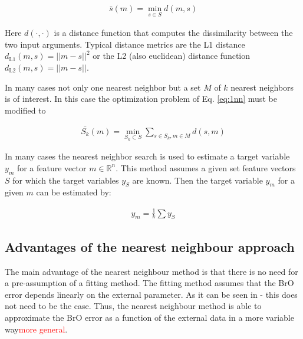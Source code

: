 \documentclass  [
  paper    = a4,
  BCOR     = 10mm,
  twoside,
  fontsize = 12pt,
  fleqn,
  toc      = bibnumbered,
  toc      = listofnumbered,
  numbers  = noendperiod,
  headings = normal,
  listof   = leveldown,
  version  = 3.03
]                                       {scrreprt}
\begin{document}
%

\begin{align}
\bar{s}(m) = \min_{s \in S} d(m, s) \label{eq:1nn}
\end{align}

%
Here $d(\cdot, \cdot)$ is a distance function that computes the dissimilarity between the two input arguments. Typical distance metrics are the L1 distance $d_{\text{L1} 	
}(m, s) = ||m - s||^2$ or the L2 (also euclidean) distance function $d_{\text{L2} 
}(m, s) = ||m - s||$. 


In many cases not only one nearest neighbor but a set $M$ of $k$ nearest neighbors is of interest. In this case the optimization problem of Eq. \ref{eq:1nn} must be modified to

%

\begin{align}
\bar{S_k}(m) = \min_{S_k \subset S} \sum_{s \in S_k, m \in M} d(s, m) \label{eq:knn}
\end{align}

%

In many cases the nearest neighbor search is used to estimate a target variable $y_m$ for a feature vector $m \in \mathbb{R}^n$. This method assumes a given set feature vectors $S$ for which the target variables $y_S$ are known. Then the target variable $y_m$ for a given $m$ can be estimated by:

%

\begin{align}
y_m = \frac{1}{k} \sum y_S \label{eq:knn_regression}
\end{align}

%

\subsection*{Advantages of the nearest neighbour approach}
	The main advantage of the nearest neighbour method is that there is no need for a pre-assumption of a fitting method. The fitting method assumes that the BrO error depends linearly  on the external parameter. As it can be seen in - this does not need to be the case. Thus, the nearest neighbour method is able to approximate the BrO error as a function of the external data in a more variable way\textcolor{red}{more general}.
%
\end{document}
